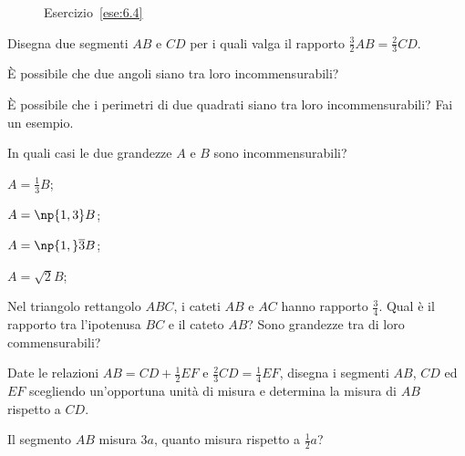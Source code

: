 \begin{figure}[!htb]
	\centering
	\caption{Esercizio~\ref{ese:6.4}}\label{fig:ese6.4}
\end{figure}

\begin{esercizio}
\label{ese:6.5}
Disegna due segmenti $AB$ e $CD$ per i quali valga il rapporto $\frac{3}{2}AB=\frac{2}{3}CD$.
\end{esercizio}

\begin{esercizio}
\label{ese:6.6}
\`E possibile che due angoli siano tra loro incommensurabili?
\end{esercizio}

\begin{esercizio}
\label{ese:6.7}
\`E possibile che i perimetri di due quadrati siano tra loro incommensurabili? Fai un esempio.
\end{esercizio}

\begin{esercizio}
\label{ese:6.8}
In quali casi le due grandezze $A$ e $B$ sono incommensurabili?
\begin{multicols}{4}
\begin{enumeratea}
\item $A=\frac{1}{3}B$;
\item $A=\np{1,3}B$;
\item $A=\np{1,}\overline{3}B$;
\item $A=\sqrt{2}B$;
\end{enumeratea}
\end{multicols}
\end{esercizio}

\begin{esercizio}
\label{ese:6.9}
Nel triangolo rettangolo $ABC$, i cateti $AB$ e $AC$ hanno rapporto $\frac{3}{4}$. Qual è il rapporto tra  l'ipotenusa $BC$ e il cateto $AB$? Sono grandezze tra di loro commensurabili?
\end{esercizio}

\begin{esercizio}
\label{ese:6.10}
Date le relazioni $AB=CD+\frac{1}{2}EF$ e $\frac{2}{3}CD=\frac{1}{4}EF$, disegna i segmenti $AB$, $CD$ ed $EF$ scegliendo un'opportuna unità di misura e determina la misura di $AB$ rispetto a $CD$.
\end{esercizio}

\begin{esercizio}
\label{ese:6.11}
Il segmento $AB$ misura $3a$, quanto misura rispetto a $\frac{1}{2}a$? 
\end{esercizio}

